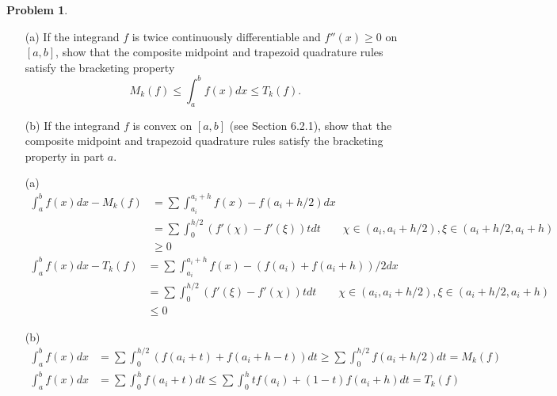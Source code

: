 \documentclass[a4paper]{book}
\makeatletter
\newenvironment{sol}[1][\solname]{\par
  \pushQED{\qed}
  \normalfont \topsep6\p@\@plus6\p@\relax
  \trivlist
  \item[\hskip\labelsep
        \itshape
    #1\@addpunct{.}]\ignorespaces
}{\popQED\endtrivlist\@endpefalse}
\providecommand{\solname}{Solution}
\numberwithin{equation}{chapter}
\theoremstyle{definition}
\newtheorem{pro}{Problem}
\makeatother
\begin{document}
\begin{pro}
    \begin{itemize}
        \item [(a)] If the integrand $f$ is twice continuously
        differentiable and $f''(x) \geq 0$ on $[a, b]$, show that 
        the composite midpoint and trapezoid quadrature rules 
        satisfy the bracketing property 
        \[ M_k(f) \leq \int_a^b f(x) dx \leq T_k(f).\]

        \item [(b)] If the integrand $f$ is convex on $[a, b]$ (see 
        Section 6.2.1), show that the composite midpoint and 
        trapezoid quadrature rules satisfy the bracketing property in
        part $a$.
    \end{itemize}
\end{pro}
\begin{sol}
    \begin{itemize}
        \item [(a)] \begin{align*}
            \int_a^b f(x) dx - M_k(f) &= \sum \int_{a_i}^{a_i + h} f(x) - f(a_i + h /2) dx \\
&= \sum \int_0^{h/2} (f'(\chi) - f'(\xi))t dt  \qquad \chi \in (a_i, a_i + h / 2), \xi \in (a_i + h / 2,
a_i +h) \\
            &\geq 0 
        \end{align*}
        \begin{align*}
            \int_a^b f(x) dx - T_k(f) &= \sum \int_{a_i}^{a_i + h} f(x) - (f(a_i) + f(a_i + h)) /2 dx \\
            &= \sum \int_0^{h/2} (f'(\xi) - f'(\chi))t dt  \qquad \chi \in (a_i, a_i + h / 2), \xi \in (a_i + h / 2,
            a_i +h) \\
            &\leq 0 
        \end{align*}

        \item [(b)] \begin{align*}
            \int_a^b f(x) dx  &= \sum \int_0^{h/2} (f(a_i +t) + f(a_i +h - t) )dt 
            \geq  \sum \int_0^{h/2} f(a_i + h/2) dt = M_k(f)
        \end{align*}
        \begin{align*}
            \int_a^b f(x) dx  &= \sum \int_0^{h} f(a_i +t )dt 
            \leq  \sum \int_0^{h} tf(a_i) + (1-t)f(a_i +h) dt = T_k(f)
        \end{align*}
    \end{itemize}
\end{sol}
\end{document}
